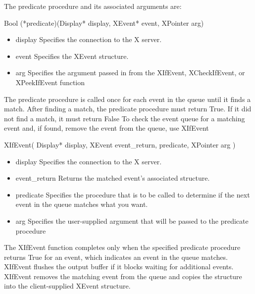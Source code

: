 \documentclass{report}
\begin{document}
\begin{itemize}
            \bigbreak \noindent 
            The predicate procedure and its associated arguments are:
            \bigbreak \noindent 
            \begin{cppcode}
            Bool (*predicate)(Display* display, XEvent* event, XPointer arg)
            \end{cppcode}
            \bigbreak \noindent
            \begin{itemize}
                \item display Specifies the connection to the X server.
                \item event Specifies the XEvent structure.
                \item arg Specifies the argument passed in from the XIfEvent, XCheckIfEvent, or XPeekIfEvent function
            \end{itemize}
            The predicate procedure is called once for each event in the queue until it finds a match. After finding a match, the predicate procedure must return True. If it did not find a match, it must return False
            \bigbreak \noindent 
            To check the event queue for a matching event and, if found, remove the event from the queue, use XIfEvent
            \bigbreak \noindent 
            \begin{cppcode}
                XIfEvent(
                    Display* display,
                    XEvent event_return,
                    predicate,
                    XPointer arg
                )
            \end{cppcode}
            \bigbreak \noindent
            \begin{itemize}
                \item display Specifies the connection to the X server.
                \item event_return Returns the matched event’s associated structure.
                \item predicate Specifies the procedure that is to be called to determine if the next event in the queue matches what you want.
                \item arg Specifies the user-supplied argument that will be passed to the predicate procedure
            \end{itemize}
            The XIfEvent function completes only when the specified predicate procedure returns True for an event, which indicates an event in the queue matches. XIfEvent flushes the output buffer if it blocks waiting for additional events. XIfEvent removes the matching event from the queue and copies the structure into the client-supplied XEvent structure.

\end{itemize}
\end{document}
